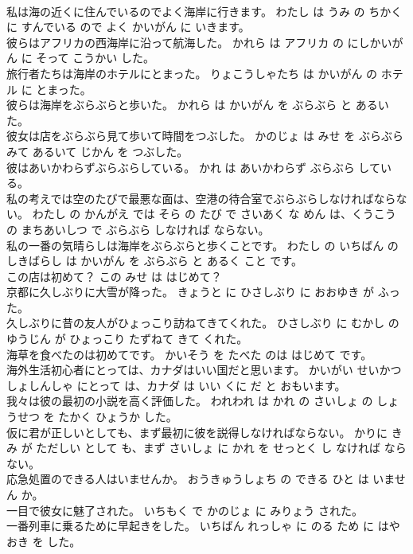 \documentclass[8pt]{extreport}
\begin{document}
\begin{CJK}{UTF8}{min}
\\	私は海の近くに住んでいるのでよく海岸に行きます。	わたし は うみ の ちかく に すんでいる ので よく かいがん に いきます。	
\\	彼らはアフリカの西海岸に沿って航海した。	かれら は アフリカ の にしかいがん に そって こうかい した。	
\\	旅行者たちは海岸のホテルにとまった。	りょこうしゃたち は かいがん の ホテル に とまった。	
\\	彼らは海岸をぶらぶらと歩いた。	かれら は かいがん を ぶらぶら と あるいた。	
\\	彼女は店をぶらぶら見て歩いて時間をつぶした。	かのじょ は みせ を ぶらぶら みて あるいて じかん を つぶした。	
\\	彼はあいかわらずぶらぶらしている。	かれ は あいかわらず ぶらぶら している。	
\\	私の考えでは空のたびで最悪な面は、空港の待合室でぶらぶらしなければならない。	わたし の かんがえ では そら の たび で さいあく な めん は、くうこう の まちあいしつ で ぶらぶら しなければ ならない。	
\\	私の一番の気晴らしは海岸をぶらぶらと歩くことです。	わたし の いちばん の しきばらし は かいがん を ぶらぶら と あるく こと です。	
\\	この店は初めて？	この みせ は はじめて？	
\\	京都に久しぶりに大雪が降った。	きょうと に ひさしぶり に おおゆき が ふった。	
\\	久しぶりに昔の友人がひょっこり訪ねてきてくれた。	ひさしぶり に むかし の ゆうじん が ひょっこり たずねて きて くれた。	
\\	海草を食べたのは初めてです。	かいそう を たべた のは はじめて です。	
\\	海外生活初心者にとっては、カナダはいい国だと思います。	かいがい せいかつ しょしんしゃ にとって は、カナダ は いい くに だ と おもいます。	
\\	我々は彼の最初の小説を高く評価した。	われわれ は かれ の さいしょ の しょうせつ を たかく ひょうか した。	
\\	仮に君が正しいとしても、まず最初に彼を説得しなければならない。	かりに きみ が ただしい として も、まず さいしょ に かれ を せっとく し なければ ならない。	
\\	応急処置のできる人はいませんか。	おうきゅうしょち の できる ひと は いません か。	
\\	一目で彼女に魅了された。	いちもく で かのじょ に みりょう された。	
\\	一番列車に乗るために早起きをした。	いちばん れっしゃ に のる ため に はやおき を した。	

\end{CJK}
\end{document}
